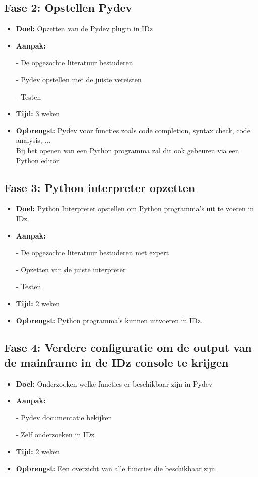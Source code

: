 \subsection{Fase 2: Opstellen Pydev}
\begin{itemize}
    \item \textbf{Doel:}
    Opzetten van de Pydev plugin in IDz
    \item \textbf{Aanpak:}
    \item[-] De opgezochte literatuur bestuderen
    \item[-] Pydev opstellen met de juiste vereisten
    \item[-] Testen
    \item \textbf{Tijd:} 3 weken
    \item \textbf{Opbrengst:}
    Pydev voor functies zoals code completion, syntax check, code analysis, ... \\ 
    Bij het openen van een Python programma zal dit ook gebeuren via een Python editor
\end{itemize}


\subsection{Fase 3: Python interpreter opzetten}
\begin{itemize}
    \item \textbf{Doel:}
    Python Interpreter opstellen om Python programma's uit te voeren in IDz.
    \item \textbf{Aanpak:}
    \item[-] De opgezochte literatuur bestuderen met expert
    \item[-] Opzetten van de juiste interpreter
    \item[-] Testen
    
    \item \textbf{Tijd:} 2 weken
    \item \textbf{Opbrengst:}
    Python programma's kunnen uitvoeren in IDz.
\end{itemize}


\subsection{Fase 4: Verdere configuratie om de output van de mainframe in de IDz console te krijgen}
\begin{itemize}
    \item \textbf{Doel:}
    Onderzoeken welke functies er beschikbaar zijn in Pydev
    \item \textbf{Aanpak:}
    \item[-] Pydev documentatie bekijken
    \item[-] Zelf onderzoeken in IDz
    
    \item \textbf{Tijd:} 2 weken
    \item \textbf{Opbrengst:}
    Een overzicht van alle functies die beschikbaar zijn. 
\end{itemize}

